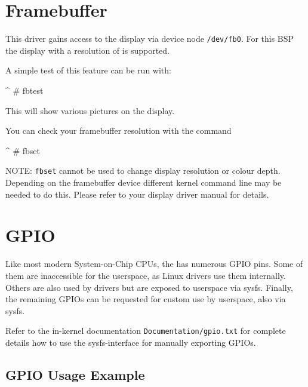 \section{Framebuffer}					\label{sec:fb}

This driver gains access to the display via device node \texttt{/dev/fb0}.
For this BSP the \perDisplayName{} display with a resolution of
\perDisplayRes{} is supported.

A simple test of this feature can be run with:

\begin{ptxshell}[escapechar=|]{^}
# fbtest
\end{ptxshell}

This will show various pictures on the display.

You can check your framebuffer resolution with the command
\begin{ptxshell}[escapechar=|]{^}
# fbset
\end{ptxshell}

NOTE: \texttt{fbset} cannot be used to change display resolution or colour depth.
Depending on the framebuffer device different kernel command line may be needed
to do this. Please refer to your display driver manual for details.


\newcommand{\perGpioChip}{192}
\newcommand{\perGpioNumber}{193}

\section{GPIO}					\label{sec:GPIO}

Like most modern System-on-Chip CPUs, the \perCpuName{} has numerous GPIO pins.
Some of them are inaccessible for the userspace, as Linux drivers use them
internally. Others are also used by drivers but are exposed to userspace via
sysfs. Finally, the remaining GPIOs can be requested for custom use by
userspace, also via sysfs.

Refer to the in-kernel documentation \texttt{Documentation/gpio.txt} for
complete details how to use the sysfs-interface for manually exporting GPIOs.


\subsection{GPIO Usage Example}		\label{sec:gpioexample}

